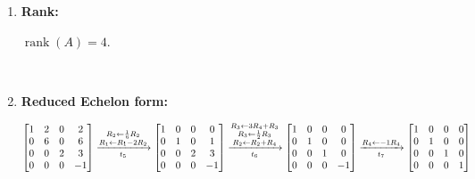 \begin{enumerate}
\item
    \textbf{Rank:}
    \begin{answer}
        $
        \operatorname{rank}(A)=4.
        $
    \end{answer} \\

\item 
    \textbf{Reduced Echelon form:} \\[1.0em]

    \begin{answer}
        $\begin{bmatrix}
            1 & 2 & 0 & 2 \\
            0 & 6 & 0 & 6 \\
            0 & 0 & 2 & 3 \\
            0 & 0 & 0 & -1
        \end{bmatrix}
        \xrightarrow [t_5]{
            \substack{
                R_2 \leftarrow \frac{1}{6}R_2 \\
                R_1 \leftarrow R_1 - 2R_2
            }
        }
        \begin{bmatrix}
            1 & 0 & 0 & 0 \\
            0 & 1 & 0 & 1 \\
            0 & 0 & 2 & 3 \\
            0 & 0 & 0 & -1
        \end{bmatrix}
        \xrightarrow [t_6]{
            \substack{
                R_3 \leftarrow 3R_4 + R_3 \\
                R_3 \leftarrow \frac{1}{2}R_3 \\
                R_2 \leftarrow R_2 + R_4
            }
        }
        \begin{bmatrix}
            1 & 0 & 0 & 0 \\
            0 & 1 & 0 & 0 \\
            0 & 0 & 1 & 0 \\
            0 & 0 & 0 & -1
        \end{bmatrix} \\[0.5em]
        \xrightarrow [t_7]{R_4 \leftarrow -1R_4}
        \begin{bmatrix}
            1 & 0 & 0 & 0 \\
            0 & 1 & 0 & 0 \\
            0 & 0 & 1 & 0 \\
            0 & 0 & 0 & 1
        \end{bmatrix}
        $
    \end{answer}

\end{enumerate}